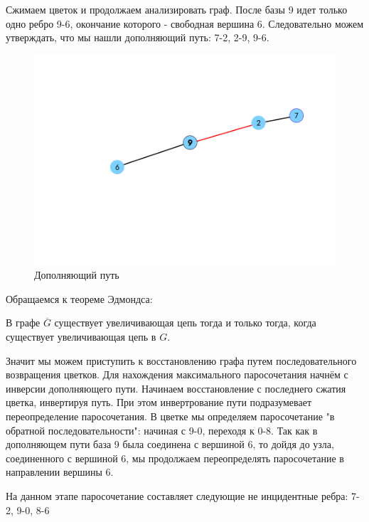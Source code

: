 \documentclass[14pt, a4paper]{extarticle}
\begin{document}
    Сжимаем цветок и продолжаем анализировать граф. После базы 9 идет только одно ребро 9-6, окончание которого - свободная вершина 6. Следовательно можем утверждать, что мы нашли дополняющий путь: 7-2, 2-9, 9-6.

    \begin{figure}[h!]
        \centering
        \includegraphics[scale=0.3]{5.png}
        \caption{Дополняющий путь}
        \label{fig:my_label}
    \end{figure} 

    \pagebreak

    Обращаемся к теореме Эдмондса:
    
    В графе $\overline G$ существует увеличивающая цепь тогда и только тогда, когда существует увеличивающая цепь в $G$.

    Значит мы можем приступить к восстановлению графа путем последовательного возвращения цветков.
    Для нахождения максимального паросочетания начнём с инверсии дополняющего пути.
    Начинаем восстановление с последнего сжатия цветка, инвертируя путь. При этом инвертрование пути подразумевает переопределение паросочетания. В цветке мы определяем паросочетание "в обратной последовательности": начиная с 9-0, переходя к 0-8. Так как в дополняющем пути база 9 была соединена с вершиной 6, то дойдя до узла, соединенного с вершиной 6, мы продолжаем переопределять паросочетание в направлении вершины 6.

    На данном этапе паросочетание составляет следующие не инцидентные ребра:
    7-2, 9-0, 8-6

    \pagebreak
    
\end{document}
